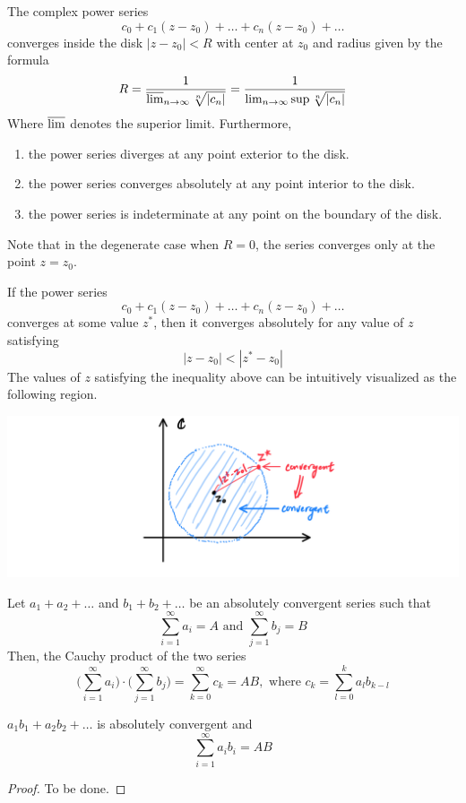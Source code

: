   \begin{theorem}
  The complex power series 
  \[c_0 + c_1 (z - z_0) + \ldots + c_n (z - z_0) + \ldots\]
  converges inside the disk $|z - z_0| < R$ with center at $z_0$ and radius given by the formula
  \[R = \frac{1}{\varlimsup_{n \rightarrow \infty} \sqrt[n]{|c_n|}} = \frac{1}{\lim_{n \rightarrow \infty} \sup{\sqrt[n]{|c_n|}}}\]
  Where $\varlimsup$ denotes the superior limit. Furthermore, 
  \begin{enumerate}
    \item the power series diverges at any point exterior to the disk. 
    \item the power series converges absolutely at any point interior to the disk. 
    \item the power series is indeterminate at any point on the boundary of the disk. 
  \end{enumerate}
  Note that in the degenerate case when $R = 0$, the series converges only at the point $z = z_0$. 
  \end{theorem}

  \begin{corollary}
  If the power series 
  \[c_0 + c_1 (z - z_0) + \ldots + c_n (z - z_0) + \ldots\]
  converges at some value $z^*$, then it converges absolutely for any value of $z$ satisfying
  \[|z - z_0| < |z^* - z_0|\]
  The values of $z$ satisfying the inequality above can be intuitively visualized as the following region. 
  \begin{center}
      \includegraphics[scale=0.25]{img/Abels_First_Theorem.PNG}
  \end{center}
  \end{corollary}

  \begin{theorem}
  Let $a_1 + a_2 + \ldots$ and $b_1 + b_2 + \ldots$ be an absolutely convergent series such that
  \[\sum_{i=1}^\infty a_i = A \text{ and } \sum_{j=1}^\infty b_j = B\]
  Then, the Cauchy product of the two series 
  \[\bigg( \sum_{i=1}^\infty a_i \bigg) \cdot \bigg( \sum_{j=1}^\infty b_j \bigg) = \sum_{k=0}^\infty c_k = A B, \text{ where } c_k = \sum_{l=0}^k a_l b_{k-l}\]

  $a_1 b_1 + a_2 b_2 + \ldots$ is absolutely convergent and 
  \[\sum_{i = 1}^\infty a_i b_i = A B\]
  \end{theorem}
  \begin{proof}
  To be done. 
  \end{proof}

